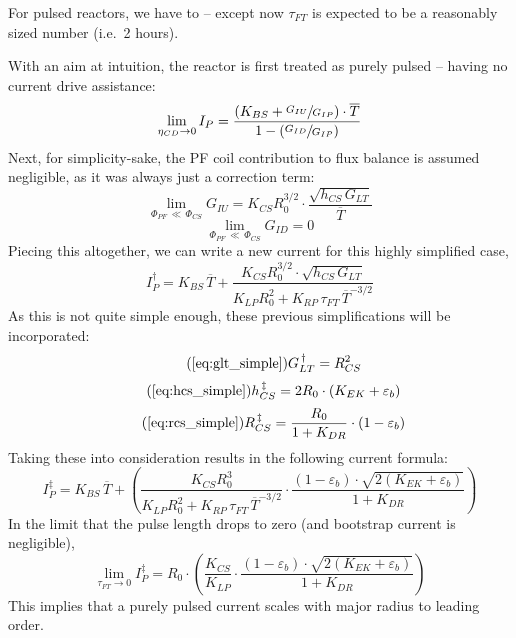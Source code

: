For pulsed reactors, we have to  -- except now $\tau_{FT}$ is expected to be a reasonably sized number (i.e.\ 2 hours).

With an aim at intuition, the reactor is first treated as purely pulsed -- having no current drive assistance:
\begin{equation}
	\lim_{\eta_{CD} \to 0} I_P = \frac{ \left( K_{BS} + \sfrac{ G_{IU} }{ G_{IP} } \right) \cdot \overline T }{ 1 - \left( \sfrac{ G_{ID} }{ G_{IP} } \right) }
\end{equation}
Next, for simplicity-sake, the PF coil contribution to flux balance is assumed negligible, as it was always just a correction term:
\begin{equation}
	\lim_{ \Phi_{PF} \, \ll \, \Phi_{CS} } G_{IU} = K_{CS} R_0^{3/2} \cdot \frac{ \sqrt{ h_{CS} \, G_{LT} } }{ \overline T }
\end{equation}
\begin{equation}
	\lim_{ \Phi_{PF} \, \ll \, \Phi_{CS} } G_{ID} = 0
\end{equation}
Piecing this altogether, we can write a new current for this highly simplified case,
\begin{equation}
	I_P^\dagger = K_{BS} \, \overline T + \frac{ K_{CS} R_0^{3/2} \cdot \sqrt{ h_{CS} \, G_{LT} } }{ K_{LP} R_0^2 + K_{RP} \, \tau_{FT} \, \overline T ^ {-3/2} }
\end{equation}
As this is not quite simple enough, these previous simplifications will be incorporated:
\begin{equation}
	\tag{\ref{eq:glt_simple}}
	G_{LT}^{\,\dagger} = R_{CS}^2
\end{equation}
\begin{equation}
	\tag{\ref{eq:hcs_simple}}
	h_{CS}^{\,\ddagger} = 2 R_0 \cdot \left( K_{EK} + \varepsilon_b \right)
\end{equation}
\begin{equation}
	\tag{\ref{eq:rcs_simple}}
	R_{CS}^{\,\ddagger} = \frac{ R_0 }{ 1 + K_{DR} } \cdot \left( 1 - \varepsilon_b  \right)
\end{equation}
Taking these into consideration results in the following current formula:
\begin{equation}
	I_P^\ddagger = K_{BS} \, \overline T + \left( \frac{ K_{CS} R_0^3 }{ K_{LP} R_0^2 + K_{RP} \, \tau_{FT} \, \overline T ^ {-3/2} } \cdot \frac{ ( 1 - \varepsilon_b ) \cdot \sqrt{ 2 ( K_{EK} + \varepsilon_b ) } }{ 1 + K_{DR} } \right)
\end{equation}
In the limit that the pulse length drops to zero (and bootstrap current is negligible),
\begin{equation}
	\label{eq:tau_zero}
	\lim_{ \tau_{FT} \to 0 } I_P^\ddagger = R_0 \cdot \left( \frac{ K_{CS} }{ K_{LP} } \cdot \frac{ ( 1 - \varepsilon_b ) \cdot \sqrt{ 2 ( K_{EK} + \varepsilon_b ) } }{ 1 + K_{DR} } \right)
\end{equation}
This implies that a purely pulsed current scales with major radius to leading order.

